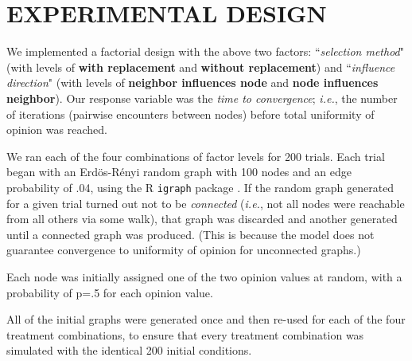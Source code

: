 
\section{EXPERIMENTAL DESIGN}

We implemented a factorial design with the above two factors:
``\textsl{selection method}" (with levels of \textbf{with replacement} and
\textbf{without replacement}) and ``\textsl{influence direction}" (with levels
of \textbf{neighbor influences node} and \textbf{node influences neighbor}).
Our response variable was the \textsl{time to convergence}; \textit{i.e.}, the
number of iterations (pairwise encounters between nodes) before total
uniformity of opinion was reached.

We ran each of the four combinations of factor levels for 200 trials. Each
trial began with an Erd\"{o}s-R\'{e}nyi random graph \cite{erdos_random_1959}
with 100 nodes and an edge probability of .04, using the R \texttt{igraph}
package \cite{igraph}. If the random graph generated for a given trial turned
out not to be \textit{connected} (\textit{i.e.}, not all nodes were reachable
from all others via some walk), that graph was discarded and another generated
until a connected graph was produced. (This is because the model does not
guarantee convergence to uniformity of opinion for unconnected graphs.)

Each node was initially assigned one of the two opinion values at random, with
a probability of p=.5 for each opinion value. 

All of the initial graphs were generated once and then re-used for each of the
four treatment combinations, to ensure that every treatment combination was
simulated with the identical 200 initial conditions.

